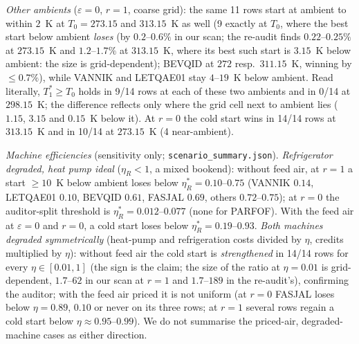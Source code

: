 \documentclass[10pt]{article}
\begin{document}
\emph{Other ambients} ($\varepsilon=0$, $r=1$, coarse grid): the same 11 rows start at ambient to within $2$~K at $T_0=273.15$ and $313.15$~K as well (9 exactly at $T_0$, where the best start below ambient \emph{loses} (by $0.2$--$0.6\%$ in our scan; the re-audit finds $0.22$--$0.25\%$ at $273.15$~K and $1.2$--$1.7\%$ at $313.15$~K, where its best such start is $3.15$~K below ambient: the size is grid-dependent); BEVQID at $272$ resp.\ $311.15$~K, winning by $\le0.7\%$), while VANNIK and LETQAE01 stay $4$--$19$~K below ambient. Read literally, $T_1^\ast\ge T_0$ holds in 9/14 rows at each of these two ambients and in 0/14 at $298.15$~K; the difference reflects only where the grid cell next to ambient lies ($1.15$, $3.15$ and $0.15$~K below it). At $r=0$ the cold start wins in 14/14 rows at $313.15$~K and in 10/14 at $273.15$~K (4 near-ambient).

\emph{Machine efficiencies} (sensitivity only; \texttt{scenario\_summary.json}). \emph{Refrigerator degraded, heat pump ideal} ($\eta_R<1$, a mixed bookend): without feed air, at $r=1$ a start $\ge10$~K below ambient loses below $\eta_R^\ast=0.10$--$0.75$ (VANNIK $0.14$, LETQAE01 $0.10$, BEVQID $0.61$, FASJAL $0.69$, others $0.72$--$0.75$); at $r=0$ the auditor-split threshold is $\eta_R^\ast=0.012$--$0.077$ (none for PARFOF). With the feed air at $\varepsilon=0$ and $r=0$, a cold start loses below $\eta_R^\ast=0.19$--$0.93$. \emph{Both machines degraded symmetrically} (heat-pump and refrigeration costs divided by $\eta$, credits multiplied by $\eta$): without feed air the cold start is \emph{strengthened} in 14/14 rows for every $\eta\in[0.01,1]$ (the sign is the claim; the size of the ratio at $\eta=0.01$ is grid-dependent, $1.7$--$62$ in our scan at $r=1$ and $1.7$--$189$ in the re-audit's), confirming the auditor; with the feed air priced it is not uniform (at $r=0$ FASJAL loses below $\eta=0.89$, $0.10$ or never on its three rows; at $r=1$ several rows regain a cold start below $\eta\approx0.95$--$0.99$). We do not summarise the priced-air, degraded-machine cases as either direction.
\end{document}
